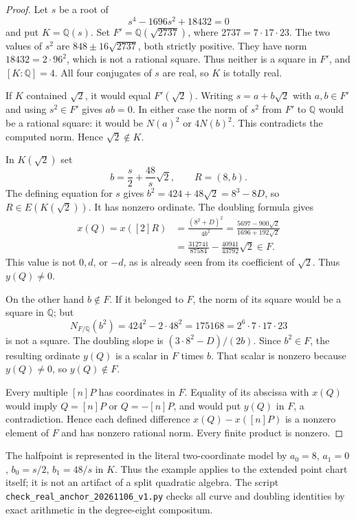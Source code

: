 \begin{proof}
Let $s$ be a root of
\[
                         s^4-1696s^2+18432=0
\]
and put $K=\mathbb Q(s)$.  Set $F'=\mathbb Q(\sqrt{2737})$,
where $2737=7\cdot17\cdot23$.  The two values of $s^2$ are
$848\pm16\sqrt{2737}$, both strictly positive.  They have
norm $18432=2\cdot96^2$, which is not a rational square.
Thus neither is a square in $F'$, and $[K:\mathbb Q]=4$.
All four conjugates of $s$ are real, so $K$ is totally real.

If $K$ contained $\sqrt2$, it would equal $F'(\sqrt2)$.
Writing $s=a+b\sqrt2$ with $a,b\in F'$ and using
$s^2\in F'$ gives $ab=0$.  In either case the norm of
$s^2$ from $F'$ to $\mathbb Q$ would be a rational square:
it would be $N(a)^2$ or $4N(b)^2$.  This contradicts the
computed norm.  Hence $\sqrt2\notin K$.

In $K(\sqrt2)$ set
\[
                  b=\frac{s}{2}+\frac{48}{s}\sqrt2,
                          \qquad R=(8,b).
\]
The defining equation for $s$ gives
$b^2=424+48\sqrt2=8^3-8D$, so $R\in E(K(\sqrt2))$.
It has nonzero ordinate.  The doubling formula gives
\begin{align*}
 x(Q)=x([2]R)
   &=\frac{(8^2+D)^2}{4b^2}
     =\frac{5697-900\sqrt2}{1696+192\sqrt2}\\
   &=\frac{312741}{87584}
                          -\frac{40941}{43792}\sqrt2\in F.
\end{align*}
This value is not $0,d$, or $-d$, as is already seen from
its coefficient of $\sqrt2$.  Thus $y(Q)\ne0$.

On the other hand $b\notin F$.  If it belonged to $F$, the
norm of its square would be a square in $\mathbb Q$; but
\[
           N_{F/\mathbb Q}(b^2)=424^2-2\cdot48^2
                           =175168=2^6\cdot7\cdot17\cdot23
\]
is not a square.  The doubling slope is
$(3\cdot8^2-D)/(2b)$.  Since $b^2\in F$, the resulting
ordinate $y(Q)$ is a scalar in $F$ times $b$.  That scalar
is nonzero because $y(Q)\ne0$, so $y(Q)\notin F$.

Every multiple $[n]P$ has coordinates in $F$.  Equality of
its abscissa with $x(Q)$ would imply
$Q=[n]P$ or $Q=-[n]P$, and would put $y(Q)$ in $F$, a
contradiction.  Hence each defined difference
$x(Q)-x([n]P)$ is a nonzero element of $F$ and has nonzero
rational norm.  Every finite product is nonzero.
\end{proof}

The halfpoint is represented in the literal two-coordinate
model by $a_0=8$, $a_1=0$, $b_0=s/2$, $b_1=48/s$ in $K$.
Thus the example applies to the extended point chart itself;
it is not an artifact of a split quadratic algebra.
The script \texttt{check\_real\_anchor\_20261106\_v1.py}
checks all curve and doubling identities by exact arithmetic
in the degree-eight compositum.

